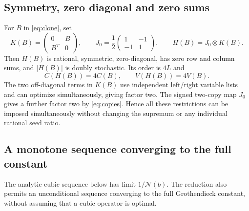 \documentclass[11pt]{article}
\newcommand{\N}{\mathcal N}
\begin{document}
\subsection{Symmetry, zero diagonal and zero sums}
For $B$ in \eqref{eq:clone}, set
\begin{equation}\label{eq:balanced}
 K(B)=\begin{pmatrix}0&B\\B^T&0\end{pmatrix},\qquad
 J_0=\frac12\begin{pmatrix}1&-1\\-1&1\end{pmatrix},\qquad
 H(B)=J_0\otimes K(B).
\end{equation}
Then $H(B)$ is rational, symmetric, zero-diagonal, has zero row and
column sums, and $|H(B)|$ is doubly stochastic. Its order is $4L$ and
\begin{equation}\label{eq:balanced-norm}
 C(H(B))=4C(B),\qquad V(H(B))=4V(B).
\end{equation}
The two off-diagonal terms in $K(B)$ use independent left/right variable
lists and can optimize simultaneously, giving factor two. The signed
two-copy map $J_0$ gives a further factor two by \eqref{eq:copies}.
Hence all these restrictions can be imposed simultaneously without
changing the supremum or any individual rational seed ratio.

\subsection{A monotone sequence converging to the full constant}
The analytic cubic sequence below has limit $1/\N(b)$.
The reduction also permits an unconditional sequence converging to the
full Grothendieck constant, without assuming that a cubic operator is
optimal.
\end{document}
